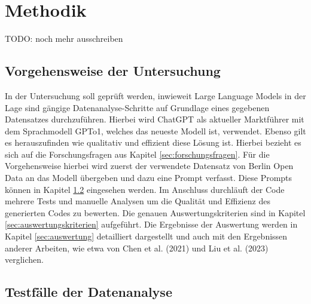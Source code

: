 \documentclass[11pt,a4paper]{article}
\begin{document}
\section{Methodik}
\label{sec:methodik}
TODO: noch mehr ausschreiben

\subsection{Vorgehensweise der Untersuchung}
    In der Untersuchung soll geprüft werden, inwieweit Large Language Models in der Lage sind gängige Datenanalyse-Schritte auf Grundlage eines gegebenen Datensatzes durchzuführen. Hierbei wird ChatGPT als aktueller Marktführer mit dem Sprachmodell GPTo1, welches das neueste Modell ist, verwendet. Ebenso gilt es herauszufinden wie qualitativ und effizient diese Lösung ist. Hierbei bezieht es sich auf die Forschungsfragen aus Kapitel \ref{sec:forschungsfragen}.
    Für die Vorgehensweise hierbei wird zuerst der verwendete Datensatz von Berlin Open Data an das Modell übergeben und dazu eine Prompt verfasst. Diese Prompts können in Kapitel \ref{sec:testfaelle} eingesehen werden.
    Im Anschluss durchläuft der Code mehrere Tests und manuelle Analysen um die Qualität und Effizienz des generierten Codes zu bewerten. Die genauen Auswertungskriterien sind in Kapitel \ref{sec:auswertungskriterien} aufgeführt.
    Die Ergebnisse der Auswertung werden in Kapitel \ref{sec:auswertung} detailliert dargestellt und auch mit den Ergebnissen anderer Arbeiten, wie etwa von Chen et al. (2021)\cite{chen2021evaluatinglargelanguagemodels} und Liu et al. (2023)\cite{NEURIPS2023_43e9d647} verglichen.

\subsection{Testfälle der Datenanalyse}
\label{sec:testfaelle}
\end{document}
